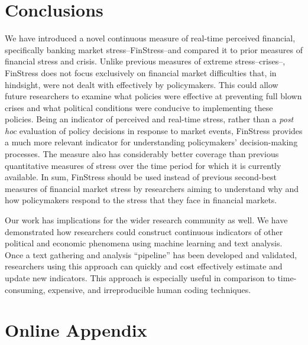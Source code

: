\documentclass[]{article}
\begin{document}
\section{Conclusions}\label{conclusions}

We have introduced a novel continuous measure of real-time perceived financial, specifically banking market stress--FinStress--and compared it to prior measures of financial stress and crisis. Unlike previous measures of extreme stress--crises--, FinStress does not focus exclusively on financial market difficulties that, in hindsight, were not dealt with effectively by policymakers. This could allow future researchers to examine what policies were effective at preventing full blown crises and what political conditions were conducive to implementing these policies. Being an indicator of perceived and real-time stress, rather than a \emph{post hoc} evaluation of policy decisions in response to market events, FinStress provides a much more relevant indicator for understanding policymakers' decision-making processes. The measure also has considerably better coverage than previous quantitative measures of stress over the time period for which it is currently available. In sum, FinStress should be used instead of previous second-best measures of financial market stress by researchers aiming to understand why and how policymakers respond to the stress that they face in financial markets.

Our work has implications for the wider research community as well. We have demonstrated how researchers could construct continuous indicators of other political and economic phenomena using machine learning and text analysis. Once a text gathering and analysis ``pipeline'' \citep{Leek2015} has been developed and validated, researchers using this approach can quickly and cost effectively estimate and update new indicators. This approach is especially useful in comparison to time-consuming, expensive, and irreproducible human coding techniques.




\pagebreak
\renewcommand{\thepage}{A-\arabic{page}}\setcounter{page}{1}
\renewcommand{\thesection}{Appendix \arabic{section}}\setcounter{section}{0}
\renewcommand{\thetable}{A-\arabic{table}}\setcounter{table}{0}
\renewcommand{\thefigure}{A-\arabic{figure}}\setcounter{figure}{0}
\clearpage

\section*{Online Appendix}
\end{document}
